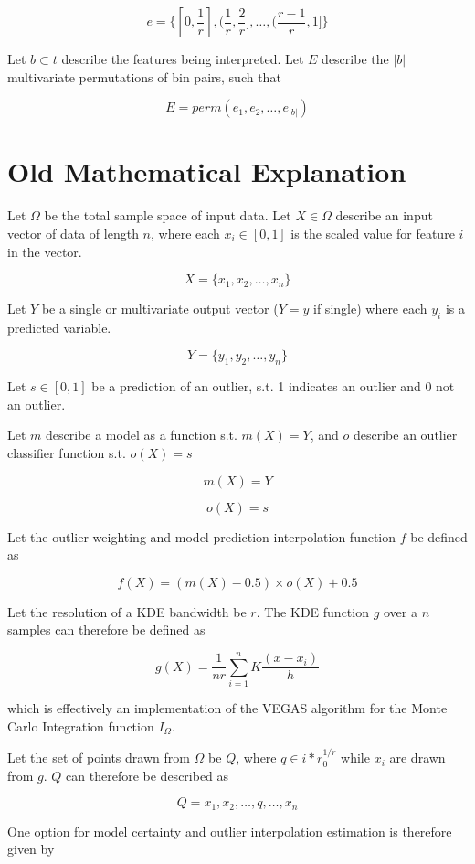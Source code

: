 \documentclass[a4paper, twocolumn]{article}
\begin{document}
$$e = \{[0, \frac{1}{r}], (\frac{1}{r}, \frac{2}{r}], \ldots, (\frac{r-1}{r}, 1]\}$$

Let $b \subset t$ describe the features being interpreted. Let $E$ describe the $|b|$ multivariate permutations of bin pairs, such that

$$E = perm(e_1, e_2, \ldots, e_|b|)$$


\section{Old Mathematical Explanation}

Let $\Omega$ be the total sample space of input data. Let $X \in \Omega$ describe an input vector of data of length $n$, where each $x_i \in [0, 1]$ is the scaled value for feature $i$ in the vector.

$$X = \{x_1, x_2, \ldots, x_n\}$$

Let $Y$ be a single or multivariate output vector ($Y = y$ if single) where each $y_i$ is a predicted variable.

$$Y = \{y_1, y_2, \ldots, y_n\}$$

Let $s \in [0, 1]$ be a prediction of an outlier, s.t. 1 indicates an outlier and 0 not an outlier.

Let $m$ describe a model as a function s.t. $m(X) = Y$, and $o$ describe an outlier classifier function s.t. $o(X) = s$

$$m(X) = Y$$

$$o(X) = s$$

Let the outlier weighting and model prediction interpolation function $f$ be defined as

$$f(X) = (m(X) - 0.5) \times o(X) + 0.5$$

Let the resolution of a KDE bandwidth be $r$. The KDE function $g$ over a $n$ samples can therefore be defined as

$$g(X) = \frac{1}{nr} \sum^n_{i=1} K \frac{(x - x_i)}{h}$$

which is effectively an implementation of the VEGAS algorithm for the Monte Carlo Integration function $I_\Omega$.

Let the set of points drawn from $\Omega$ be $Q$, where $q \in {i*r}^{1/r}_0$ while $x_i$ are drawn from $g$. $Q$ can therefore be described as

$$Q = {x_1, x_2, \ldots, q, \ldots, x_n}$$

One option for model certainty and outlier interpolation estimation is therefore given by
\end{document}
